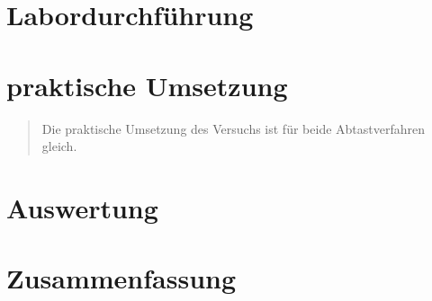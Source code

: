     \section{Labordurchführung}
    \begin{quote}
   	\end{quote}%
    	    
    
    \section{praktische Umsetzung}
    \begin{quote}
    Die praktische Umsetzung des Versuchs ist für beide Abtastverfahren gleich.
    
    \end{quote}%
    
    
    \section{Auswertung}
    \begin{quote}    
    \end{quote}%
    
    \section{Zusammenfassung}
    \begin{quote}
    \end{quote}%





\begin{thebibliography}{999}




\end{thebibliography}


